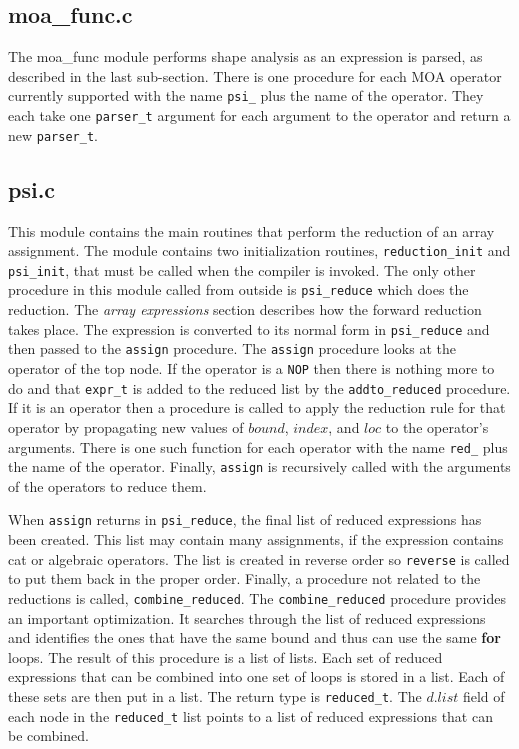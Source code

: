 \subsection{{\bf moa\_func.c}}
The moa\_func module performs shape analysis as an expression is parsed, as
described in the last sub-section.  There is one procedure for each MOA
operator currently supported with the name {\tt psi\_} plus the name of the
operator.  They each take one {\tt parser\_t} argument for each argument to the
operator and return a new {\tt parser\_t}.

\subsection{{\bf psi.c}}
This module contains the main routines that perform the reduction of an
array assignment.  The module contains two initialization routines,
{\tt reduction\_init} and {\tt psi\_init}, that must be called when the compiler is
invoked.  The only other procedure in this module called from outside
is {\tt psi\_reduce} which does the reduction.  The {\it array expressions} section
describes how the forward reduction takes place.  The expression is
converted to its normal form in {\tt psi\_reduce} and then passed to the {\tt assign}
procedure.  The {\tt assign} procedure looks at the operator of the top node.
If the operator is a {\tt NOP} then there is nothing more to do and that {\tt expr\_t}
is added to the reduced list by the {\tt addto\_reduced} procedure.  If it
is an operator then a procedure is called to apply the reduction rule for
that operator by propagating new values of $bound$, $index$, and $loc$ to
the operator's arguments.  There is one such function for each operator with
the name {\tt red\_} plus the name of the operator.  Finally, {\tt assign} is 
recursively called with the arguments of the operators to reduce them.

When {\tt assign} returns in {\tt psi\_reduce}, the final list of reduced expressions
has been created.  This list may contain many assignments, if the expression
contains cat or algebraic operators.  The list is created in reverse
order so {\tt reverse} is called to put them back in the proper order.  Finally,
a procedure not related to the reductions is called, {\tt combine\_reduced}.
The {\tt combine\_reduced} procedure provides an important optimization.  It 
searches
through the list of reduced expressions and identifies the ones that have the
same bound and thus can use the same {\bf for} loops.  The result of this 
procedure is a list of lists.  Each set of reduced expressions that can be
combined into one set of loops is stored in a list.  Each of these sets
are then put in a list.  The return type is {\tt reduced\_t}.  The $d.list$
field of each node in the {\tt reduced\_t} list points to a list of reduced
expressions that can be combined.


